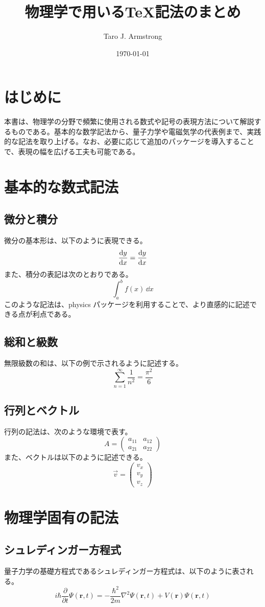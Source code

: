 \documentclass{ltjsarticle}
\title{物理学で用いる\TeX 記法のまとめ}
\author{Taro J. Armstrong}
\date{\today}
\begin{document}
\maketitle

\section{はじめに}
本書は、物理学の分野で頻繁に使用される数式や記号の表現方法について解説するものである。基本的な数学記法から、量子力学や電磁気学の代表例まで、実践的な記法を取り上げる。なお、必要に応じて追加のパッケージを導入することで、表現の幅を広げる工夫も可能である。

\section{基本的な数式記法}
\subsection{微分と積分}
微分の基本形は、以下のように表現できる。
\[
\dv{y}{x} = \frac{\dd y}{\dd x}
\]
また、積分の表記は次のとおりである。
\[
\int_a^b f(x)\,\dd x
\]
このような記法は、physics パッケージを利用することで、より直感的に記述できる点が利点である。

\subsection{総和と級数}
無限級数の和は、以下の例で示されるように記述する。
\[
\sum_{n=1}^{\infty} \frac{1}{n^2} = \frac{\pi^2}{6}
\]

\subsection{行列とベクトル}
行列の記法は、次のような環境で表す。
\[
A = \begin{pmatrix} a_{11} & a_{12} \\ a_{21} & a_{22} \end{pmatrix}
\]
また、ベクトルは以下のように記述できる。
\[
\vec{v} = \begin{pmatrix} v_x \\ v_y \\ v_z \end{pmatrix}
\]

\section{物理学固有の記法}
\subsection{シュレディンガー方程式}
量子力学の基礎方程式であるシュレディンガー方程式は、以下のように表される。
\[
i\hbar \frac{\partial}{\partial t} \Psi(\mathbf{r},t) = -\frac{\hbar^2}{2m}\nabla^2 \Psi(\mathbf{r},t) + V(\mathbf{r}) \Psi(\mathbf{r},t)
\]
\end{document}
